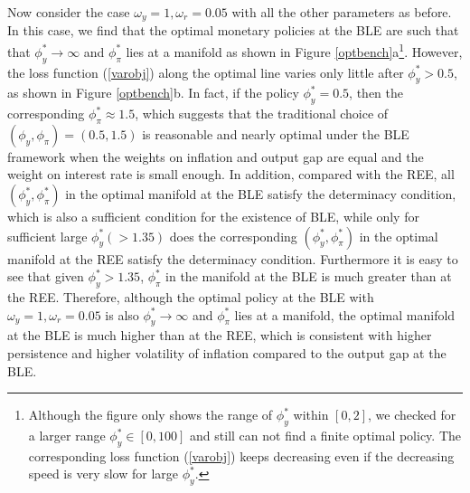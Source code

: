 \def\CTeXPreproc{Created by ctex v0.2.5, don't edit!}\documentclass[12pt]{article}
\numberwithin{equation}{section}
\begin{document}
Now consider the case $\omega_y=1,\omega_r=0.05$ with all the other parameters as before. In this case, we find that the optimal monetary policies at the BLE are such that  that $\phi_y^*\to \infty$ and $\phi_\pi^*$ lies at a manifold as shown in Figure \ref{optbench}a\footnote{Although the figure only shows the range of $\phi_y^*$ within $[0,2]$, we checked for a larger range  $\phi_y^*\in [0,100]$ and still can not find a finite optimal policy. The corresponding loss function (\ref{varobj}) keeps decreasing even if the decreasing speed is very slow for large $\phi_y^*$. }.
However, the loss function (\ref{varobj}) along the optimal line varies only little after $\phi_y^*>0.5$, as shown in Figure \ref{optbench}b. In fact, if the policy $\phi_y^*=0.5$, then the corresponding $\phi_\pi^*\approx 1.5$, which suggests that the traditional choice of $(\phi_y, \phi_\pi)=(0.5, 1.5)$ is reasonable and nearly optimal under the BLE framework when the weights on inflation and output gap are equal and the weight on interest rate is small enough. In addition, compared with the REE, all $(\phi_y^*, \phi_\pi^*)$ in the optimal manifold at the BLE satisfy the determinacy condition, which is also a sufficient condition for the existence of BLE, while only for sufficient large $\phi_y^*(>1.35)$ does the corresponding $(\phi_y^*, \phi_\pi^*)$ in the optimal manifold at the REE satisfy the determinacy condition. Furthermore it is easy to see that given $\phi_y^*>1.35$, $\phi_\pi^*$ in the manifold at the BLE is much greater than at the REE. Therefore, although the optimal policy at the BLE with $\omega_y=1,\omega_r=0.05$ is also $\phi_y^*\to \infty$ and $\phi_\pi^*$ lies at a manifold, the optimal manifold at the BLE is much higher than at the REE, which is consistent with higher persistence and higher volatility of inflation compared to the output gap at the BLE.



\end{document}
